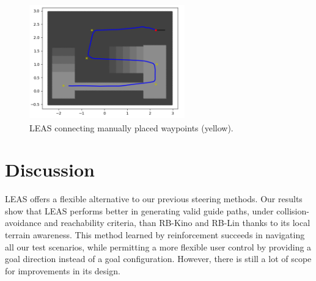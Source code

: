 
\begin{figure}[t]
    \centering
    \includegraphics[width=0.6\textwidth, height=5cm]{Figures/Chapter_LEAS/follow_waypoints_bauzil.png}
    \caption{LEAS connecting manually placed waypoints (yellow).}
    \label{fig:bauzil_waypoints}
\end{figure}




\section{Discussion\label{sub:leas:discussion}}
LEAS offers a flexible alternative to our previous steering methods. Our results show that LEAS performs better in generating valid guide paths, under collision-avoidance and reachability criteria, than RB-Kino and RB-Lin thanks to its local terrain awareness. 
This method learned by reinforcement succeeds in navigating all our test scenarios, while permitting a more flexible user control by providing a goal direction instead of a goal configuration. 
However, there is still a lot of scope for improvements in its design.

